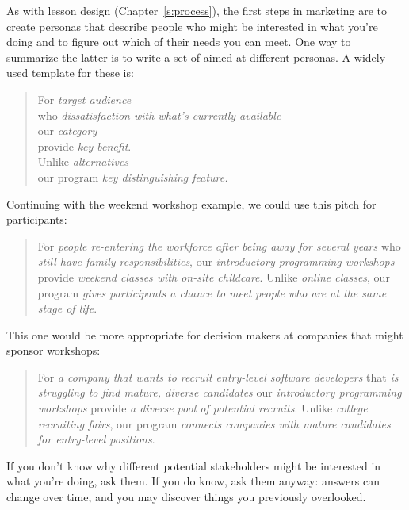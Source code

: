 As with lesson design (Chapter~\ref{s:process}),
the first steps in marketing are
to create personas that describe people who might be interested in what you're doing
and to figure out which of their needs you can meet.
One way to summarize the latter is to write a set of 
aimed at different personas.
A widely-used template for these is:

\begin{quote}

  For \emph{target audience} \\
  who \emph{dissatisfaction with what's currently available} \\
  our \emph{category} \\
  provide \emph{key benefit}. \\
  Unlike \emph{alternatives} \\
  our program \emph{key distinguishing feature.}

\end{quote}

Continuing with the weekend workshop example,
we could use this pitch for participants:

\begin{quote}

  For \emph{people re-entering the workforce after being away for several years}
  who \emph{still have family responsibilities},
  our \emph{introductory programming workshops}
  provide \emph{weekend classes with on-site childcare}.
  Unlike \emph{online classes},
  our program \emph{gives participants a chance to meet people who are at the same stage of life}.

\end{quote}

\noindent
This one would be more appropriate for
decision makers at companies that might sponsor workshops:

\begin{quote}

  For \emph{a company that wants to recruit entry-level software developers}
  that \emph{is struggling to find mature, diverse candidates}
  our \emph{introductory programming workshops}
  provide \emph{a diverse pool of potential recruits}.
  Unlike \emph{college recruiting fairs},
  our program \emph{connects companies with mature candidates for entry-level positions}.

\end{quote}

If you don't know why different potential stakeholders might be interested in what you're doing,
ask them.
If you do know,
ask them anyway:
answers can change over time,
and you may discover things you previously overlooked.


